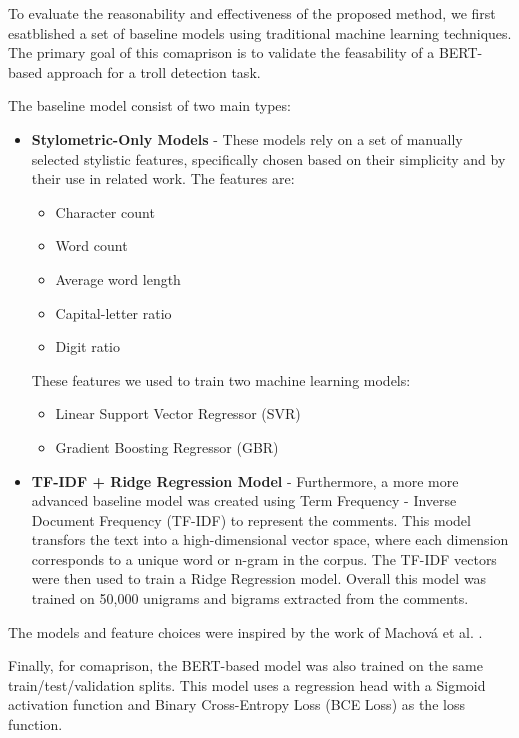 \documentclass[twoside]{ctuthesis}
\theoremstyle{plain}
\theoremstyle{definition}
\theoremstyle{note}
\begin{document}
To evaluate the reasonability and effectiveness of the proposed method, we first esatblished a set of baseline models using traditional machine learning techniques. The primary goal of this comaprison is to validate the feasability of a BERT-based approach for a troll detection task.\par
The baseline model consist of two main types:
\begin{itemize}
	\item \textbf{Stylometric-Only Models} - These models rely on a set of manually selected stylistic features, specifically chosen based on their simplicity and by their use in related work. The features are:
	\begin{itemize}
		\item Character count
		\item Word count
		\item Average word length
		\item Capital-letter ratio
		\item Digit ratio
	\end{itemize}
		These features we used to train two machine learning models:
	\begin{itemize}
		\item Linear Support Vector Regressor (SVR)
		\item Gradient Boosting Regressor (GBR)
	\end{itemize}

	\item \textbf{TF-IDF + Ridge Regression Model} - Furthermore, a more more advanced baseline model was created using Term Frequency - Inverse Document Frequency (TF-IDF) to represent the comments. This model transfors the text into a high-dimensional vector space, where each dimension corresponds to a unique word or n-gram in the corpus. The TF-IDF vectors were then used to train a Ridge Regression model. Overall this model was trained on 50,000 unigrams and bigrams extracted from the comments.\par
	\par

\end{itemize}
The models and feature choices were inspired by the work of Machová et al. \cite{Machova2021Algorithms}.\par

Finally, for comaprison, the BERT-based model was also trained on the same train/test/validation splits. This model uses a regression head with a Sigmoid activation function and Binary Cross-Entropy Loss (BCE Loss) as the loss function.\par
\end{document}
